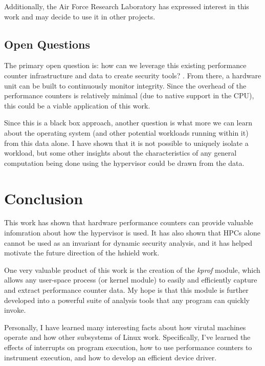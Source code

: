 \documentclass[notitlepage]{article}
\begin{document}
Additionally, the Air Force Research Laboratory has expressed interest in this
work and may decide to use it in other projects.

\subsection{Open Questions}
The primary open question is: how can we leverage this existing performance
counter infrastructure and data to create security tools? . From there, a
hardware unit can be built to continuously monitor integrity. Since the overhead
of the performance counters is relatively minimal (due to native support in the
CPU), this could be a viable application of this work.

Since this is a black box approach, another question is what more we can learn
about the operating system (and other potential workloads running within it)
from this data alone. I have shown that it is not possible to uniquely isolate a
workload, but some other insights about the characteristics of any general
computation being done using the hypervisor could be drawn from the data.

\section{Conclusion}
\label{sec:conclusion}
This work has shown that hardware performance counters can provide valuable
infomration about how the hypervisor is used. It has also shown that HPCs alone
cannot be used as an invariant for dynamic security analysis, and it has helped
motivate the future direction of the hshield work.

One very valuable product of this work is the creation of the \textit{kprof}
module, which allows any user-space process (or kernel module) to easily and
efficiently capture and extract performance counter data. My hope is that this
module is further developed into a powerful suite of analysis tools that any
program can quickly invoke.

Personally, I have learned many interesting facts about how virutal machines
operate and how other subsystems of Linux work. Specifically, I've learned the
effects of interrupts on program execution, how to use performance counters to
instrument execution, and how to develop an efficient device driver.

\nocite{*}

{}

\end{document}
